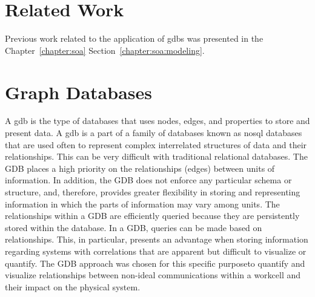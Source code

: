 \section{Related Work}
Previous work related to the application of \glspl{gdb} was presented in the Chapter~\ref{chapter:soa} Section~\ref{chapter:soa:modeling}.

\section{Graph Databases}
A \gls{gdb} is the type of databases that uses nodes, edges, and properties to store and present data. A \gls{gdb} is a part of a family of databases known as \gls{nosql} databases that are used often to represent complex interrelated structures of data and their relationships.  This can be very difficult with traditional relational databases.  The GDB places a high priority on the relationships (edges) between units of information.  In addition, the GDB does not enforce any particular schema or structure, and, therefore, provides greater flexibility in storing and representing information in which the parts of information may vary among units. The relationships within a GDB are efficiently queried because they are persistently stored within the database.  In a GDB, queries can be made based on relationships. This, in particular, presents an advantage when storing information regarding systems with correlations that are apparent but difficult to visualize or quantify. The GDB approach was chosen for this specific purpose\textemdash{}to quantify and visualize relationships between non-ideal communications within a workcell and their impact on the physical system.

